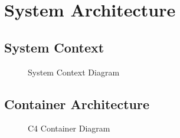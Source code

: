 \section{System Architecture}

\subsection{System Context}
\begin{figure}[H]
  \centering
  \caption{System Context Diagram}
\end{figure}

\subsection{Container Architecture}
\begin{figure}[H]
  \centering
  \caption{C4 Container Diagram}
\end{figure}
